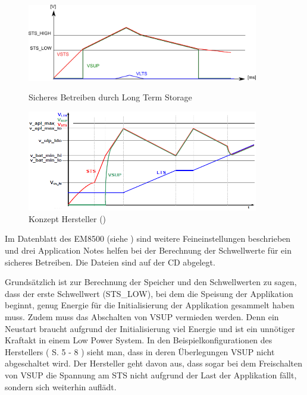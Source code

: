 \begin{figure}[ht]
 \begin{minipage}[t]{0.5\textwidth}
   \includegraphics[width=0.9\textwidth]{2TheoretischeGrundlagen/imag/levelMitLTS.png}
   \caption{Sicheres Betreiben durch Long Term Storage}
   \label{energiespeisung_lts} 
 \end{minipage}
 \begin{minipage}[t]{0.5\textwidth}
   \includegraphics[width=0.9\textwidth]{2TheoretischeGrundlagen/imag/KonzeptFirma.png}
   \caption{Konzept Hersteller (\cite{datasheet_EM85})}
   \label{konzept_levels_em} 
 \end{minipage}
\end{figure}

Im Datenblatt des EM8500 (siehe \cite{datasheet_EM85}) sind weitere Feineinstellungen beschrieben und drei Application Notes helfen bei der Berechnung der Schwellwerte für ein sicheres Betreiben. Die Dateien sind auf der CD abgelegt.

Grundsätzlich ist zur Berechnung der Speicher und den Schwellwerten zu sagen, dass der erste Schwellwert (STS\_LOW), bei dem die Speisung der Applikation beginnt, genug Energie für die Initialisierung der Applikation gesammelt haben muss. Zudem muss das Abschalten von VSUP vermieden werden. Denn ein Neustart braucht aufgrund der Initialisierung viel Energie und ist ein unnötiger Kraftakt in einem Low Power System. In den Beispielkonfigurationen des Herstellers (\cite{datasheet_EM85} S. 5 - 8 ) sieht man, dass in deren Überlegungen VSUP nicht abgeschaltet wird. Der Hersteller geht davon aus, dass sogar bei dem Freischalten von VSUP die Spannung am STS nicht aufgrund der Last der Applikation fällt, sondern sich weiterhin auflädt.

